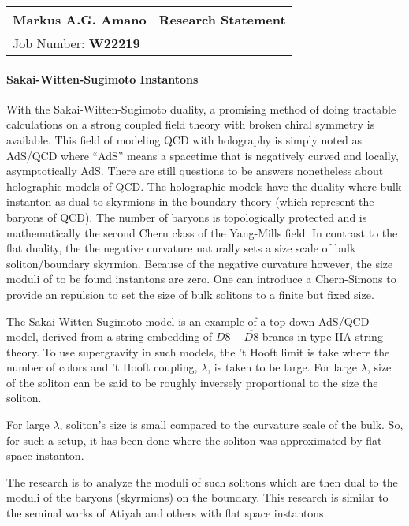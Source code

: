 \documentclass[12pt]{article}
\begin{document}
\begin{center}
  \begin{tabularx}{\textwidth} { 
      >{\raggedright\arraybackslash}X 
    >{\raggedleft\arraybackslash}X  }
    \huge Markus A.G. Amano & Research Statement\\
    \hline
    Job Number: \textbf{W22219} & \\
  \end{tabularx}
\end{center}

\paragraph{Sakai-Witten-Sugimoto Instantons}
With the Sakai-Witten-Sugimoto duality, a promising method of doing tractable calculations on a strong coupled field theory with broken chiral symmetry is available.
This field of modeling QCD with holography is simply noted as AdS/QCD where ``AdS'' means a spacetime that is negatively curved and locally, asymptotically AdS.
%
There are still questions to be answers nonetheless about holographic models of QCD.
%
The holographic models have the duality where bulk instanton as dual to skyrmions in the boundary theory (which represent the baryons of QCD).
%
The number of baryons is topologically protected and is mathematically the second Chern class of the Yang-Mills field.
%
In contrast to the flat duality, the the negative curvature naturally sets a size scale of bulk soliton/boundary skyrmion.
%
Because of the negative curvature however, the size moduli of to be found instantons are zero.
%
One can introduce a Chern-Simons to provide an repulsion to set the size of bulk solitons to a finite but fixed size.
%

The Sakai-Witten-Sugimoto model is an example of a top-down AdS/QCD model, derived from a string embedding of $D8-\overline{D8}$ branes in type IIA string theory.
%
To use supergravity in such models, the 't Hooft limit is take where the number of colors and 't Hooft coupling, $\lambda$, is taken to be large.
%
For large $\lambda$, size of the soliton can be said to be roughly inversely proportional to the size the soliton.

For large $\lambda$, soliton's size is small compared to the curvature scale of the bulk. 
%
So, for such a setup, it has been done where the soliton was approximated by flat space instanton.

The research is to analyze the moduli of such solitons which are then dual to the moduli of the baryons (skyrmions) on the boundary.
%
This research is similar to the seminal works of Atiyah and others with flat space instantons.
\end{document}
